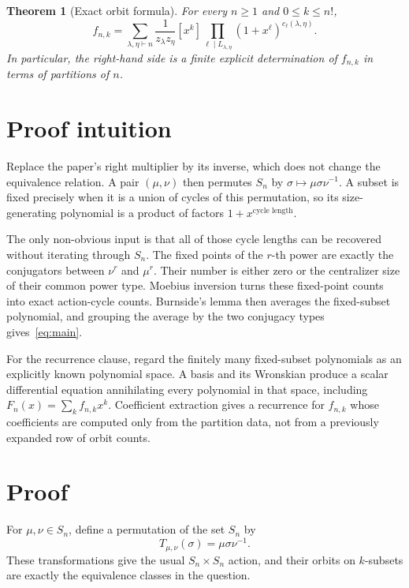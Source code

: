 \documentclass[11pt]{article}
\newtheorem{theorem}{Theorem}
\begin{document}
\begin{theorem}[Exact orbit formula]
For every $n\geq1$ and $0\leq k\leq n!$,
\begin{equation}\label{eq:main}
\boxed{
f_{n,k}=
\sum_{\lambda,\eta\vdash n}\frac1{z_\lambda z_\eta}
[x^k]\prod_{\ell\mid L_{\lambda,\eta}}
(1+x^\ell)^{c_\ell(\lambda,\eta)}.}
\end{equation}
In particular, the right-hand side is a finite explicit determination of
$f_{n,k}$ in terms of partitions of $n$.
\end{theorem}

\section{Proof intuition}

Replace the paper's right multiplier by its inverse, which does not change
the equivalence relation.  A pair $(\mu,\nu)$ then permutes $S_n$ by
$\sigma\mapsto\mu\sigma\nu^{-1}$. A subset is fixed precisely when it is a
union of cycles of this permutation, so its size-generating polynomial is a
product of factors $1+x^{\text{cycle length}}$.

The only non-obvious input is that all of those cycle lengths can be recovered
without iterating through $S_n$. The fixed points of the $r$-th power are
exactly the conjugators between $\nu^r$ and $\mu^r$. Their number is either
zero or the centralizer size of their common power type. Moebius inversion
turns these fixed-point counts into exact action-cycle counts. Burnside's
lemma then averages the fixed-subset polynomial, and grouping the average by
the two conjugacy types gives~\eqref{eq:main}.

For the recurrence clause, regard the finitely many fixed-subset polynomials
as an explicitly known polynomial space. A basis and its Wronskian produce a
scalar differential equation annihilating every polynomial in that space,
including $F_n(x)=\sum_k f_{n,k}x^k$. Coefficient extraction gives a recurrence
for $f_{n,k}$ whose coefficients are computed only from the partition data,
not from a previously expanded row of orbit counts.

\section{Proof}

For $\mu,\nu\in S_n$, define a permutation of the set $S_n$ by
\[
 T_{\mu,\nu}(\sigma)=\mu\sigma\nu^{-1}.
\]
These transformations give the usual $S_n\times S_n$ action, and their
orbits on $k$-subsets are exactly the equivalence classes in the question.
\end{document}
